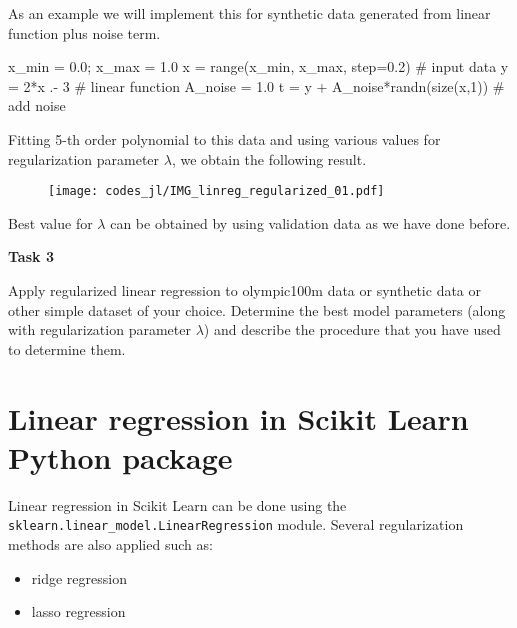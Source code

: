\documentclass[a4paper,11pt]{article} %
\newcommand{\pyinline}[1]{\texttt{#1}}
\begin{document}
As an example we will implement this for synthetic data generated from linear
function plus noise term.
\begin{juliacode}
x_min = 0.0; x_max = 1.0
x = range(x_min, x_max, step=0.2) # input data
y = 2*x .- 3 # linear function
A_noise = 1.0
t = y + A_noise*randn(size(x,1)) # add noise
\end{juliacode}
Fitting 5-th order polynomial to this data and using various values for regularization
parameter $\lambda$, we obtain the following result.
\begin{figure}[H]
\begin{center}
\texttt{[image: codes\_jl/IMG\_linreg\_regularized\_01.pdf]}
\end{center}
\end{figure}
Best value for $\lambda$ can be obtained by using validation data as we have done before.

\begin{mdframed}
\textbf{Task 3}

Apply regularized linear regression to olympic100m data or synthetic data or other simple
dataset of your choice. Determine the best model parameters (along with regularization
parameter $\lambda$)
and describe the procedure that you have used to determine them.
\end{mdframed}

\section{Linear regression in Scikit Learn Python package}
Linear regression in Scikit Learn \cite{scikit-learn} can be done using the
\pyinline{sklearn.linear_model.LinearRegression} module.
Several regularization methods are also applied such as:
\begin{itemize}
\item ridge regression
\item lasso regression
\end{itemize}




\end{document}

